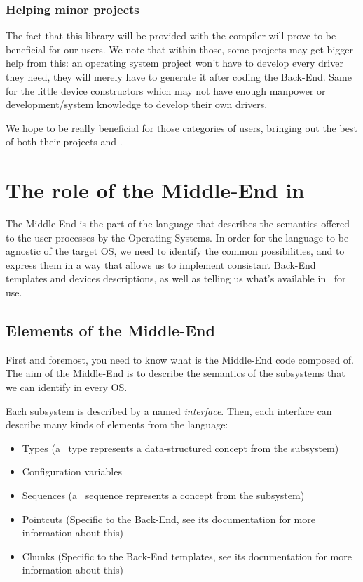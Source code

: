 \documentclass[american]{rtxreport}
\begin{document}
\subsection{Helping minor projects}

The fact that this library will be provided with the compiler will prove
to be beneficial for our users. We note that within those, some projects
may get bigger help from this: an operating system project won't have to
develop every driver they need, they will merely have to generate it after
coding the Back-End. Same for the little device constructors which may not
have enough manpower or development/system knowledge to develop their own
drivers.

We hope to be really beneficial for those categories of users, bringing out
the best of both their projects and \rtx.



\chapter{The role of the Middle-End in \rtx}

The Middle-End is the part of the language that describes the semantics offered
to the user processes by the Operating Systems. In order for the language to be
agnostic of the target OS, we need to identify the common possibilities, and to
express them in a way that allows us to implement consistant Back-End templates
and devices descriptions, as well as telling us what's available in \rtx\ for
use.

\section{Elements of the Middle-End}
\label{sec:MidElements}

First and foremost, you need to know what is the Middle-End code composed of.
The aim of the Middle-End is to describe the semantics of the subsystems that
we can identify in every OS.

Each subsystem is described by a named \emph{interface}. Then, each interface
can describe many kinds of elements from the language:
\begin{itemize}
    \item Types (a \rtx\ type represents a data-structured concept from the
                 subsystem)
    \item Configuration variables
    \item Sequences (a \rtx\ sequence represents a concept from the subsystem)
    \item Pointcuts (Specific to the Back-End, see its documentation
                     for more information about this)
    \item Chunks (Specific to the Back-End templates, see its documentation for
                  more information about this)
\end{itemize}
\end{document}
